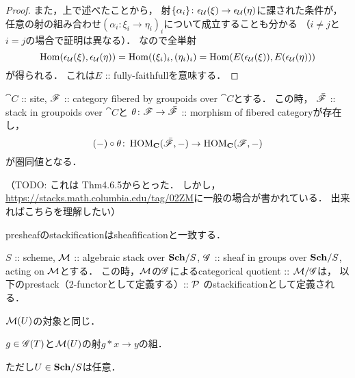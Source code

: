 \documentclass[a4paper]{jsarticle}
\newcommand{\HOM}{\operatorname{HOM}}
\begin{document}
\begin{proof}
    また，上で述べたことから，
    射$\{\alpha_i\} \colon \epsilon_{\mathcal{U}}(\xi) \to \epsilon_{\mathcal{U}}(\eta)$に課された条件が，
    任意の射の組み合わせ$(\alpha_i \colon \xi_i \to \eta_i)_i$について成立することも分かる
    （$i \neq j$と$i=j$の場合で証明は異なる）．
    なので全単射
    \[
        \operatorname{Hom}(\epsilon_{\mathcal{U}}(\xi), \epsilon_{\mathcal{U}}(\eta))
        =\operatorname{Hom}((\xi_i)_i, (\eta_i)_i)
        =\operatorname{Hom}(E(\epsilon_{\mathcal{U}}(\xi)), E(\epsilon_{\mathcal{U}}(\eta)))
    \]
    が得られる．
    これは$E$ :: fully-faithfullを意味する．
\end{proof}

\begin{Thm}
    $\cat{C}$ :: site,
    $\mathscr{F}$ :: category fibered by groupoids over $\cat{C}$とする．
    この時，
    $\bar{\mathscr{F}}$ :: stack in groupoids over $\cat{C}$と
    $\theta \colon \mathscr{F} \to \bar{\mathscr{F}}$ :: morphism of fibered categoryが存在し，
    \[ (-) \circ \theta \colon \HOM_{\cat{C}}(\bar{\fibF}, -) \to \HOM_{\cat{C}}(\fibF, -) \]
    が圏同値となる．
\end{Thm}
（TODO: これは\cite{ASS} Thm4.6.5からとった．
しかし，\url{https://stacks.math.columbia.edu/tag/02ZM}に一般の場合が書かれている．
出来ればこちらを理解したい）

\begin{Example}
    presheafのstackificationはsheafificationと一致する．
\end{Example}

\begin{Example}
    $S$ :: scheme,
    $\mathcal{M}$ :: algebraic stack over $\mathbf{Sch}/S$,
    $\mathscr{G}$ :: sheaf in groups over $\mathbf{Sch}/S$, acting on $\mathcal{M}$とする．
    この時，$\mathcal{M}$の$\mathscr{G}$によるcategorical quotient :: $\mathcal{M}/\mathscr{G}$は，
    以下のprestack（$2$-functorとして定義する）:: $\mathcal{P}$ のstackificationとして定義される．
    \begin{description}[labelindent=1cm]
        \item[Objects of $\shP(U)$.] $\mathcal{M}(U)$の対象と同じ．
        \item[Arrows of $\shP(U)$.]  $g \in \mathscr{G}(T)$と$\mathcal{M}(U)$の射$g \ast x \to y$の組．
    \end{description}
    ただし$U \in \mathbf{Sch}/S$は任意．
\end{Example}



\end{document}
